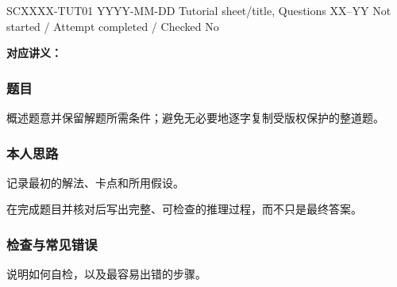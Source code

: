 
\label{tutorial:SCXXXX-TUT01}

\tutorialmeta
  {SCXXXX-TUT01}
  {YYYY-MM-DD}
  {Tutorial sheet/title, Questions XX--YY}
  {Not started / Attempt completed / Checked}
  {No}


\textbf{对应讲义：}

\subsubsection*{题目}

概述题意并保留解题所需条件；避免无必要地逐字复制受版权保护的整道题。

\subsubsection*{本人思路}

记录最初的解法、卡点和所用假设。

\begin{checkedsolution}
在完成题目并核对后写出完整、可检查的推理过程，而不只是最终答案。
\end{checkedsolution}

\subsubsection*{检查与常见错误}

说明如何自检，以及最容易出错的步骤。
